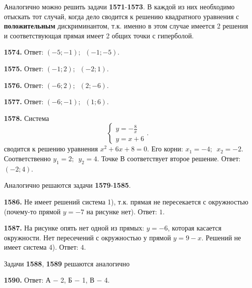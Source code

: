 Аналогично можно решить задачи  \textbf{1571}-\textbf{1573}. В каждой из них необходимо отыскать тот случай, когда дело сводится к решению квадратного уравнения с \textbf{положительным} дискриминантом, т.к. именно в этом случае имеется 2 решения и соответствующая прямая имеет 2 общих точки с гиперболой.

\textbf{1574.} \newline \null \hspace*{\fill} Ответ:  $(-5;-1);\enspace (-1;-5)$.

\textbf{1575.} \newline \null \hspace*{\fill} Ответ:  $(-1;2);\enspace (-2;1)$.

\textbf{1576.} \newline \null \hspace*{\fill} Ответ:  $(-6;2);\enspace (2;-6)$.

\textbf{1577.} \newline \null \hspace*{\fill} Ответ:  $(-6;-1);\enspace (1;6)$.

\textbf{1578.} Система $$\begin{cases}
	y=-\frac{8}{x}
	\\
	y=x+6	
\end{cases}.$$ сводится к решению уравнения $x^2+6x+8=0$.
Его корни: $x_1=-4;\enspace x_2=-2$. Соответственно $y_1=2;\enspace y_2=4$. Точке $В$ соответствует второе решение. \newline \null \hspace*{\fill} Ответ: $(-2;4)$.

Аналогично решаются задачи  \textbf{1579}-\textbf{1585}.

\textbf{1586.} Не имеет решений система 1), т.к. прямая не пересекается с окружностью (почему-то прямой $y=-7$ на рисунке нет). \newline \null \hspace*{\fill} Ответ: $1$.

\textbf{1587.}  На рисунке опять нет одной из прямых: $y=-6$, которая касается окружности. Нет пересечений с окружностью у прямой $y=9-x$. Решений не имеет система 4). \newline \null \hspace*{\fill} Ответ: $4$.

Задачи \textbf{1588}, \textbf{1589} решаются аналогично

\textbf{1590.} \newline \null \hspace*{\fill} Ответ:  А $-$ 2, Б $-$ 1, В $-$ 4.

